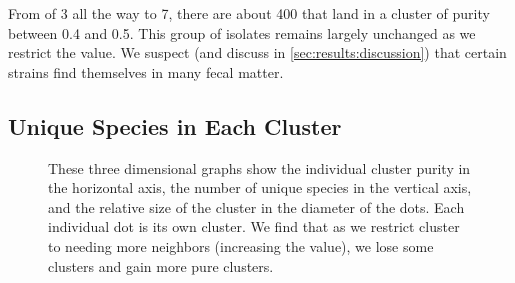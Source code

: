 From \minneigh{} of 3 all the way to 7, there are about 400 \isols{} that land in a cluster of purity between 0.4 and 0.5.  
This group of isolates remains largely unchanged as we restrict the \minneigh{} value.
We suspect (and discuss in \autoref{sec:results:discussion}) that certain \ecoli{} strains find themselves in many \spec{} fecal matter.

\subsection{Unique Species in Each Cluster}\label{sec:results:unique}

\begin{figure}[ht!]
    \centering
    \hfill
    \hfill

    \caption{These three dimensional graphs show the individual cluster purity in the horizontal axis, the number of unique species in the vertical axis, and the relative size of the cluster in the diameter of the dots. Each individual dot is its own cluster. We find that as we restrict cluster to needing more neighbors (increasing the \minneigh{} value), we lose some clusters and gain more pure clusters.}
    \label{fig:clust_pure}
\end{figure}

